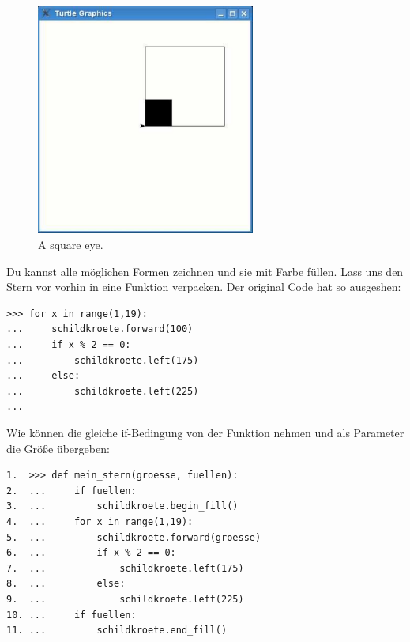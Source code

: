 \begin{figure}
\begin{center}
\includegraphics[width=72mm]{images/figure28}
\end{center}
\caption{A square eye.}\label{fig28}
\end{figure}

Du kannst alle möglichen Formen zeichnen und sie mit Farbe füllen. Lass uns den Stern vor vorhin in eine Funktion verpacken. Der original Code hat so ausgeshen:

\begin{Verbatim}[frame=single]
>>> for x in range(1,19):
...     schildkroete.forward(100)
...     if x % 2 == 0:
...         schildkroete.left(175)
...     else:
...         schildkroete.left(225)
...
\end{Verbatim}

Wie können die gleiche if-Bedingung von der  Funktion nehmen und als Parameter die Größe übergeben:

\begin{Verbatim}[frame=single]
1.  >>> def mein_stern(groesse, fuellen):
2.  ...     if fuellen:
3.  ...         schildkroete.begin_fill()
4.  ...     for x in range(1,19):
5.  ...         schildkroete.forward(groesse)
6.  ...         if x % 2 == 0:
7.  ...             schildkroete.left(175)
8.  ...         else:
9.  ...             schildkroete.left(225)
10. ...     if fuellen:
11. ...         schildkroete.end_fill()
\end{Verbatim}

